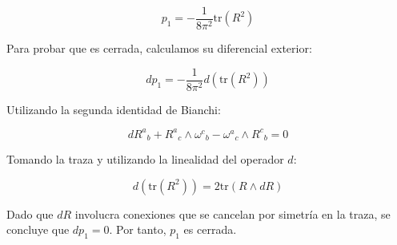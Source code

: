 \documentclass{article}
\begin{document}
\[
p_1 = - \frac{1}{8\pi^2} \text{tr}(R^2)
\]

Para probar que es cerrada, calculamos su diferencial exterior:

\[
dp_1 = - \frac{1}{8\pi^2} d(\text{tr}(R^2))
\]

Utilizando la segunda identidad de Bianchi:

\[
dR^a{}_b + R^a{}_c \wedge \omega^c{}_b - \omega^a{}_c \wedge R^c{}_b = 0
\]

Tomando la traza y utilizando la linealidad del operador \(d\):

\[
d(\text{tr}(R^2)) = 2 \text{tr}(R \wedge dR)
\]

Dado que \( dR \) involucra conexiones que se cancelan por simetría en la traza, se concluye que \( dp_1 = 0 \). Por tanto, \( p_1 \) es cerrada.
\end{document}
